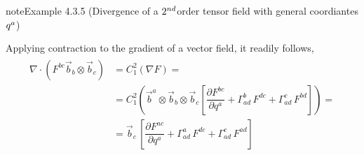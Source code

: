 \documentclass[letterpaper,10pt,english]{jupyterBook}
\begin{document}
\begin{sphinxadmonition}{note}{Example 4.3.5 (Divergence of a \protect\(2^{nd}\protect\)\sphinxhyphen{}order tensor field \sphinxhyphen{} with general coordiantes \protect\(q^{a}\protect\))}



\sphinxAtStartPar
Applying contraction to the gradient of a vector field, it readily follows,
\begin{equation*}
\begin{split}\begin{aligned}
  \nabla \cdot \left( F^{bc} \vec{b}_b \otimes \vec{b}_c \right)
  & = C_{1}^{2} \left( \nabla F \right) = \\
  & = C_1^2 \left( \vec{b}^a \otimes \vec{b}_b \otimes \vec{b}_c \left[ \dfrac{\partial F^{bc}}{\partial q^a} + \Gamma_{ad}^b \, F^{dc} + \Gamma^{c}_{ad} \, F^{bd}  \right]  \right) = \\
  & = \vec{b}_c \, \left[ \dfrac{\partial F^{ac}}{\partial q^a} + \Gamma_{ad}^a \, F^{dc} + \Gamma^{c}_{ad} \, F^{ad}  \right] 
\end{aligned}\end{split}
\end{equation*}\end{sphinxadmonition}
\end{document}
